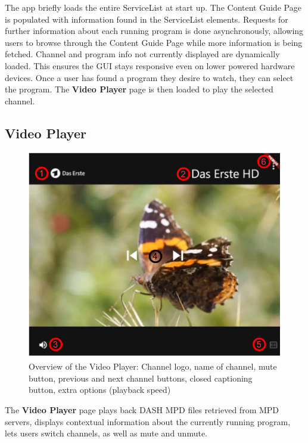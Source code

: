 \documentclass[conference]{IEEEtran}
\begin{document}
The app briefly loads the entire ServiceList at start up. The Content Guide Page is populated with information found in the ServiceList elements. Requests for further information about each running program is done asynchronously, allowing users to browse through the Content Guide Page while more information is being fetched. Channel and program info not currently displayed are dynamically loaded. This ensures the GUI stays responsive even on lower powered hardware devices. Once a user has found a program they desire to watch, they can select the program. The \textbf{Video Player} page is then loaded to play the selected channel.

\subsection{Video Player}
\begin{figure}[h]
	\centerline{\includegraphics[width=\linewidth]{figures/VideoPlayer}}
	\caption{Overview of the Video Player:  Channel logo,  name of channel,  mute button,  previous and next channel buttons,  closed captioning button,  extra options (playback speed) }
	\label{fig:videoPlayer}
\end{figure}
The \textbf{Video Player} page plays back DASH MPD files retrieved from MPD servers, displays contextual information about the currently running program, lets users switch channels, as well as mute and unmute. \\\par
\end{document}
